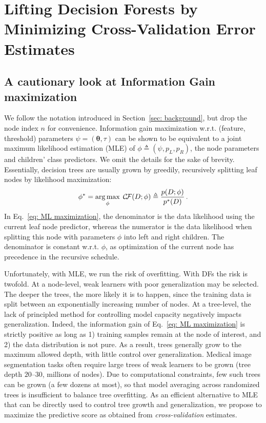 
\section{Lifting Decision Forests by Minimizing Cross-Validation Error Estimates}
\label{sec: lifting}

\subsection{A cautionary look at Information Gain maximization}

We follow the notation introduced in Section~\ref{sec: background}, but drop the node index $n$ for convenience. 
Information gain maximization w.r.t. (feature, threshold) parameters $\psi=(\bm{\theta},\tau)$ can be shown to be equivalent to a joint maximum likelihood estimation (MLE) of $\phi\!\triangleq\!(\psi,p_L,p_R)$, the node parameters and children' class predictors. We omit the details for the sake of brevity. Essentially, decision trees are usually grown by 
greedily, recursively splitting leaf nodes by likelihood maximization:
\begin{equation}
\phi^\ast = \operatorname*{arg\,max}_{\phi} \; \mathcal{C}\!\mathcal{F}(D;\phi) \triangleq \frac{p(D;\phi)}{p^\ast(D)} \, .
\label{eq: ML maximization}
\end{equation}
In Eq.~\eqref{eq: ML maximization}, the denominator is the data likelihood using the current leaf node predictor, whereas the numerator is the data likelihood when splitting this node with parameters $\phi$ into left and right children. The denominator is constant w.r.t. $\phi$, as optimization of the current node has precedence in the recursive schedule. 

Unfortunately, with MLE, we run the risk of overfitting. With DFs the risk is twofold. At a node-level, weak learners with poor generalization may be selected. The deeper the trees, the more likely it is to happen, since the training data is split between an exponentially increasing number of nodes. At a tree-level, the lack of principled method
for controlling model capacity negatively impacts generalization. Indeed, the information gain of Eq.~\eqref{eq: ML maximization} is strictly positive as long as 1) training samples remain at the node of interest, and 
  2) the data distribution is not pure. As a result, trees generally grow to the maximum allowed depth, with little control over generalization. Medical image segmentation tasks often require large trees of weak learners to be grown (tree depth $20$--$30$, millions of nodes). Due to computational constraints, few such trees can be grown (a few dozens at most), so that model averaging across randomized trees is insufficient to balance tree overfitting. As an efficient alternative to MLE that can be directly used to control tree growth and generalization, we propose to maximize the predictive score as obtained from \textit{cross-validation} estimates.

